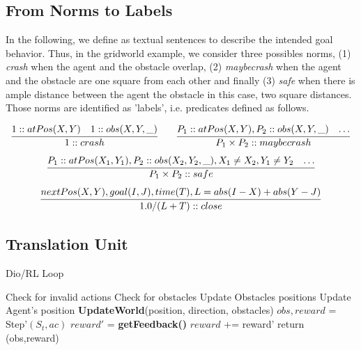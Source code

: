 \subsection{From Norms to Labels}
In the following, we define \textbf{} as textual sentences to describe the intended goal behavior. 
Thus, in the gridworld example, we consider three possibles norms, (1) \textit{crash} when the agent and the obstacle overlap, (2) \textit{maybecrash} 
when the agent and the obstacle are one square from each other and finally (3) \textit{safe} when there is ample distance between the agent the obstacle 
in this case, two square distances. Those norms are identified as 'labels', i.e. predicates defined as follows. 

\[
    \infer{1 :: crash}{1 :: atPos(X,Y) & 1 :: obs(X,Y,\_)} 
    \qquad
    \infer{P_1 \times P_2 :: maybecrash}{P_1::atPos(X,Y), P_2::obs(X,Y,\_)
      & \ldots}
\] 
\[
    \infer{P_1 \times P_2 :: safe}{
      P_1::atPos(X_1,Y_1), P_2::obs(X_2,Y_2,\_),X_1 \neq X_2, Y_1 \neq Y_2
      & \ldots
    }
\]
\[
  \infer{1.0/(L+T) :: close}{
    nextPos(X,Y), goal(I,J), time(T), L = abs(I-X) + abs(Y-J)
  }
\]
 

\subsection{Translation Unit}

  \begin{algorithm}[H]
    \caption{Dio/RL Loop}
    \begin{algorithmic}[1]
    
           
        \State Check for invalid actions
        \State Check for obstacles 
        \State Update Obstacles positions
        \State Update Agent's position
        \State \textbf{UpdateWorld}(position, direction, obstacles) 
        \State $obs, reward$ = Step'$(S_t, ac)$ 
        \State $reward'$ = \textbf{getFeedback()} 
            \State $reward$ += reward'
        \EndIf
        \State return (obs,reward)
    \EndProcedure
    
    \end{algorithmic}
    \end{algorithm}

